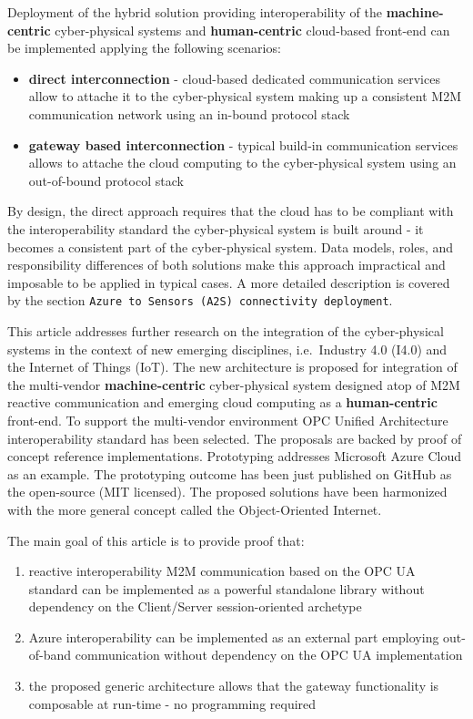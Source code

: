 \documentclass[
]{article}
\providecommand{\tightlist}{%
  \setlength{\itemsep}{0pt}\setlength{\parskip}{0pt}}
\begin{document}
Deployment of the hybrid solution providing interoperability of the
\textbf{machine-centric} cyber-physical systems and
\textbf{human-centric} cloud-based front-end can be implemented applying
the following scenarios:

\begin{itemize}
\tightlist
\item
  \textbf{direct interconnection} - cloud-based dedicated communication
  services allow to attache it to the cyber-physical system making up a
  consistent M2M communication network using an in-bound protocol stack
\item
  \textbf{gateway based interconnection} - typical build-in
  communication services allows to attache the cloud computing to the
  cyber-physical system using an out-of-bound protocol stack
\end{itemize}

By design, the direct approach requires that the cloud has to be
compliant with the interoperability standard the cyber-physical system
is built around - it becomes a consistent part of the cyber-physical
system. Data models, roles, and responsibility differences of both
solutions make this approach impractical and imposable to be applied in
typical cases. A more detailed description is covered by the section
\texttt{Azure\ to\ Sensors\ (A2S)\ connectivity\ deployment}.

This article addresses further research on the integration of the
cyber-physical systems in the context of new emerging disciplines,
i.e.~Industry 4.0 (I4.0) and the Internet of Things (IoT). The new
architecture is proposed for integration of the multi-vendor
\textbf{machine-centric} cyber-physical system designed atop of M2M
reactive communication and emerging cloud computing as a
\textbf{human-centric} front-end. To support the multi-vendor
environment OPC Unified Architecture interoperability standard has been
selected. The proposals are backed by proof of concept reference
implementations. Prototyping addresses Microsoft Azure Cloud as an
example. The prototyping outcome has been just published on GitHub as
the open-source (MIT licensed). The proposed solutions have been
harmonized with the more general concept called the Object-Oriented
Internet.

The main goal of this article is to provide proof that:

\begin{enumerate}
\def\labelenumi{\arabic{enumi}.}
\tightlist
\item
  reactive interoperability M2M communication based on the OPC UA
  standard can be implemented as a powerful standalone library without
  dependency on the Client/Server session-oriented archetype
\item
  Azure interoperability can be implemented as an external part
  employing out-of-band communication without dependency on the OPC UA
  implementation
\item
  the proposed generic architecture allows that the gateway
  functionality is composable at run-time - no programming required
\end{enumerate}
\end{document}
